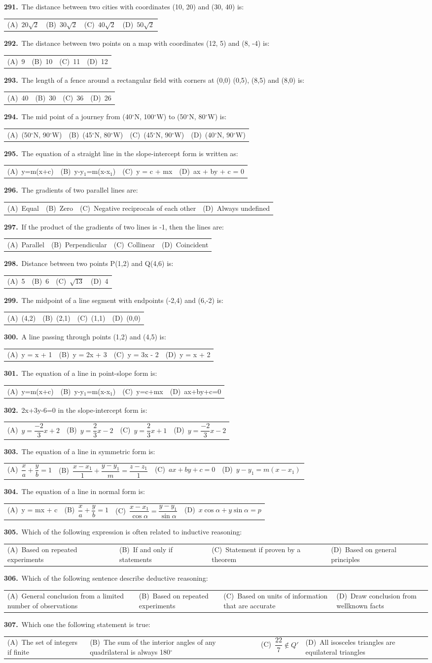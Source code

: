 \documentclass[11pt,a4paper]{article}
\makeatletter
\newcommand{\mcq}[6]{%
  \Needspace{4\baselineskip}%
  \par\medskip\noindent\textbf{#1.}\ #2\par\nopagebreak
  \noindent\begin{tabularx}{\linewidth}{@{\hspace{1.5em}}*{4}{>{\raggedright\arraybackslash}X}@{}}
    (A)~#3 & (B)~#4 & (C)~#5 & (D)~#6
  \end{tabularx}\par}
\makeatother
\begin{document}
\mcq{291}{The distance between two cities with coordinates (10, 20) and (30, 40) is:}{$20\sqrt{2}$}{$30\sqrt{2}$}{$40\sqrt{2}$}{$50\sqrt{2}$}
\mcq{292}{The distance between two points on a map with coordinates (12, 5) and (8, -4) is:}{9}{10}{11}{12}
\mcq{293}{The length of a fence around a rectangular field with corners at (0,0) (0,5), (8,5) and (8,0) is:}{40}{30}{36}{26}
\mcq{294}{The mid point of a journey from (40$^{\circ}$N, 100$^{\circ}$W) to (50$^{\circ}$N, 80$^{\circ}$W) is:}{(50$^{\circ}$N, 90$^{\circ}$W)}{(45$^{\circ}$N, 80$^{\circ}$W)}{(45$^{\circ}$N, 90$^{\circ}$W)}{(40$^{\circ}$N, 90$^{\circ}$W)}
\mcq{295}{The equation of a straight line in the slope-intercept form is written as:}{y=m(x+c)}{y-y$_{1}$=m(x-x$_{1}$)}{y = c + mx}{ax + by + c = 0}
\mcq{296}{The gradients of two parallel lines are:}{Equal}{Zero}{Negative reciprocals of each other}{Always undefined}
\mcq{297}{If the product of the gradients of two lines is -1, then the lines are:}{Parallel}{Perpendicular}{Collinear}{Coincident}
\mcq{298}{Distance between two points P(1,2) and Q(4,6) is:}{5}{6}{$\sqrt{13}$}{4}
\mcq{299}{The midpoint of a line segment with endpoints (-2,4) and (6,-2) is:}{(4,2)}{(2,1)}{(1,1)}{(0,0)}
\mcq{300}{A line passing through points (1,2) and (4,5) is:}{y = x + 1}{y = 2x + 3}{y = 3x - 2}{y = x + 2}
\mcq{301}{The equation of a line in point-slope form is:}{y=m(x+c)}{y-y$_{1}$=m(x-x$_{1}$)}{y=c+mx}{ax+by+c=0}
\mcq{302}{2x+3y-6=0 in the slope-intercept form is:}{$y=\dfrac{-2}{3}x+2$}{$y=\dfrac{2}{3}x-2$}{$y=\dfrac{2}{3}x+1$}{$y=\dfrac{-2}{3}x-2$}
\mcq{303}{The equation of a line in symmetric form is:}{$\dfrac{x}{a}+\dfrac{y}{b}=1$}{$\dfrac{x-x_{1}}{1}+\dfrac{y-y_{1}}{m}=\dfrac{z-z_{1}}{1}$}{$ax+by+c=0$}{$y-y_{1}=m(x-x_{1})$}
\mcq{304}{The equation of a line in normal form is:}{y = mx + c}{$\dfrac{x}{a}+\dfrac{y}{b}=1$}{$\dfrac{x-x_{1}}{\cos\alpha}=\dfrac{y-y_{1}}{\sin\alpha}$}{$x\cos\alpha+y\sin\alpha=p$}
\mcq{305}{Which of the following expression is often related to inductive reasoning:}{Based on repeated experiments}{If and only if statements}{Statement if proven by a theorem}{Based on general principles}
\mcq{306}{Which of the following sentence describe deductive reasoning:}{General conclusion from a limited number of observations}{Based on repeated experiments}{Based on units of information that are accurate}{Draw conclusion from wellknown facts}
\mcq{307}{Which one the following statement is true:}{The set of integers if finite}{The sum of the interior angles of any quadrilateral is always 180$^{\circ}$}{$\dfrac{22}{7}\notin Q'$}{All isosceles triangles are equilateral triangles}
\end{document}

